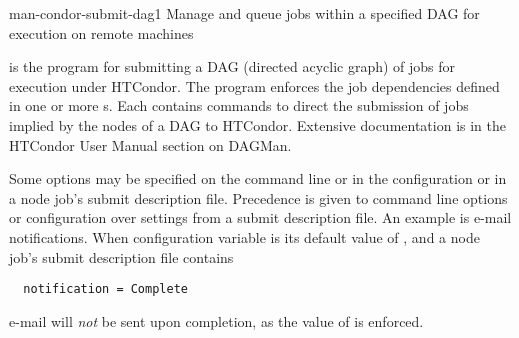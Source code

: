 \begin{ManPage}{}{man-condor-submit-dag}{1}
{Manage and queue jobs within a specified DAG for execution on remote machines}

\Synopsis
{}


\Description

 is the program for submitting a DAG (directed
acyclic graph) of jobs for execution under HTCondor.
The program enforces the job dependencies defined
in one or more s.
Each  contains commands
to direct the submission of jobs implied by the nodes
of a DAG to HTCondor.
Extensive documentation is in the HTCondor User Manual
section on DAGMan.

Some options may be specified on the command line
or in the configuration
or in a node job's submit description file.
Precedence is given to command line options or configuration
over settings from a submit description file.
An example is e-mail notifications.
When configuration variable 
is its default value of , 
and a node job's submit description file contains
\begin{verbatim}
  notification = Complete
\end{verbatim}
e-mail will \emph{not} be sent upon completion,
as the value of  is enforced.


\end{ManPage}

